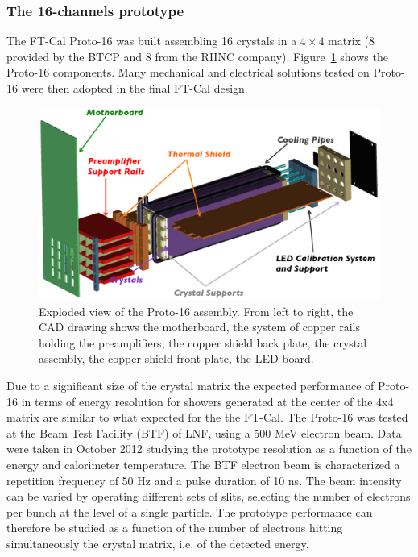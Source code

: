 \subsubsection{The 16-channels prototype}\label{par:proto-16}
The FT-Cal Proto-16 was built assembling
16 crystals in a $4\times4$ matrix (8 provided by the BTCP and 8 from
the RIINC company).
Figure~\ref{fig:p16-whole} shows the Proto-16
components.  
Many mechanical and electrical solutions tested on Proto-16 were then adopted in the final FT-Cal design.
\begin{figure}
\includegraphics[width=1.0\columnwidth]{./fig/p16-whole.eps}
\caption{Exploded view of the Proto-16 assembly. From left to right, the CAD drawing shows the motherboard, the system of copper rails holding the preamplifiers, the copper shield back plate, the crystal assembly, the copper shield front plate, the LED board.}
\label{fig:p16-whole}
\end{figure}
Due to a significant size of the  crystal matrix the expected performance of Proto-16 in terms of energy resolution for showers generated at the center of the 4x4 matrix are similar to what expected for the the FT-Cal. 
The Proto-16 was tested at the Beam Test Facility (BTF) \cite{btf} of LNF, using a 500 MeV electron
beam. Data were taken in  October 2012 studying  the prototype
resolution as a function of the energy and calorimeter temperature. The BTF electron beam is characterized a repetition
frequency of 50 Hz and a pulse duration of 10 ns. The beam intensity
can be varied by operating different sets of slits, selecting the
number of electrons per bunch at the level of a single particle. The
prototype performance can therefore be studied as a function of the
number of electrons hitting simultaneously the crystal matrix, i.e. of
the detected energy.


